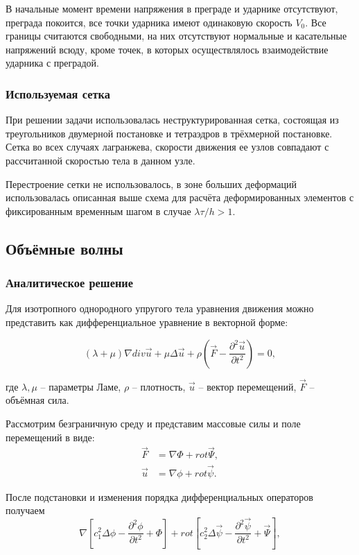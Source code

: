 В начальные момент времени напряжения в преграде и ударнике отсутствуют, преграда покоится, все точки ударника имеют одинаковую скорость $V_0$. Все границы считаются свободными, на них отсутствуют нормальные и касательные напряжений всюду, кроме точек, в которых осуществлялось взаимодействие ударника с преградой.

\subsubsection*{Используемая сетка}

При решении задачи использовалась неструктурированная сетка, состоящая из треугольников двумерной постановке и тетраэдров в трёхмерной постановке. Сетка во всех случаях лагранжева, скорости движения ее узлов совпадают с рассчитанной скоростью тела в данном узле.

Перестроение сетки не использовалось, в зоне больших деформаций использовалась описанная выше схема для расчёта деформированных элементов с фиксированным временным шагом в случае $\lambda \tau / h > 1$.


\subsection{Объёмные волны}

\subsubsection{Аналитическое решение}

Для изотропного однородного упругого тела уравнения движения можно представить как дифференциальное уравнение в векторной форме:

\begin{equation}
(\lambda+\mu)\nabla{div\vec{u}} + \mu\Delta\vec{u} + \rho(\vec{F}-\frac{\partial^2 \vec{u}}{\partial t^2}) = 0,
\end{equation}

где $\lambda, \mu$ -- параметры Ламе, $\rho$ -- плотность, $\vec{u}$ -- вектор перемещений, $\vec{F}$ -- объёмная сила.

Рассмотрим безграничную среду и представим массовые силы и поле перемещений в виде:
\begin{align}
\vec{F} &= \nabla\Phi + rot\vec{\Psi}, \nonumber\\
\vec{u} &= \nabla\phi + rot\vec{\psi}.
\end{align}

После подстановки и изменения порядка дифференциальных операторов получаем
\begin{equation}
\nabla[c_1^2\Delta\phi - \frac{\partial^2 \phi}{\partial t^2} + \Phi] + rot[c_2^2\Delta\vec{\psi} - \frac{\partial^2 \vec{\psi}}{\partial t^2} + \vec{\Psi}],
\end{equation}


